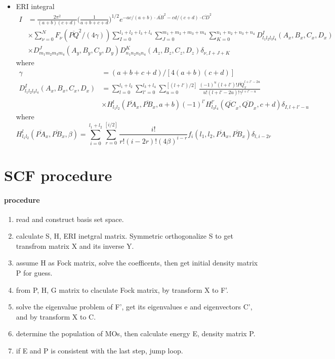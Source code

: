 \documentclass[11pt]{article}
\providecommand{\tightlist}{%
      \setlength{\itemsep}{0pt}\setlength{\parskip}{0pt}}
\begin{document}
    \begin{itemize}
\tightlist
\item
  ERI integral\\
  \begin{align*}
  I &= \frac{2\pi^2}{(a+b)(c+d)}\big(\frac{1}{a+b+c+d}\big)^{1/2} e^{-ac/(a+b)\cdot \overline{AB}^2 - cd/(c+d)\cdot \overline{CD}^2} 
  \\ 
  &\times
  \sum_{\nu=0}^{N} F_{\nu}(\overline{PQ}^2/(4\gamma))\sum_{I=0}^{l_1+l_2+l_3+l_4}
  \sum_{J=0}^{m_1+m_2+m_3+m_4}\sum_{K=0}^{n_1+n_2+n_3+n_4}
  D_{l_1l_2l_3l_4}^I (A_x,B_x,C_x,D_x)
  \\ 
  &\times
  D_{m_1m_2m_3m_4}^J (A_y,B_y,C_y,D_y)
  D_{n_1n_2n_3n_4}^K (A_z,B_z,C_z,D_z)\delta_{\nu,I+J+K}
   \end{align*}
   where
  \begin{align*}
  \gamma &= (a+b+c+d)/[4(a+b)(c+d)]
  \\
  D_{l_1l_2l_3l_4}^I (A_x,B_x,C_x,D_x) &= \sum_{l=0}^{l_1+l_2}\sum_{l'=0}^{l_3+l_4}
  \sum_{u=0}^{[(l+l')/2]} \frac{(-1)^u (l+l')! \overline{PQ}_x^{l+l'-2u}}{u!(l+l'-2u)!\gamma^{l+l'-u}}
  \\ 
  &\times
  H_{l_1l_2}^l (\overline{PA}_x,\overline{PB}_x,a+b) (-1)^{l'} 
  H_{l_3l_4}^{l'} (\overline{QC}_x,\overline{QD}_x,c+d)\delta_{I,l+l'-u}
  \end{align*}
  where 
  \[
  H_{l_1l_2}^l (\overline{PA}_x,\overline{PB}_x,\beta)
  = \sum_{i=0}^{l_1+l_2}\sum_{r=0}^{[i/2]} \frac{i!}{r!(i-2r)!(4\beta)^{i-r}} f_i (l_1,l_2,\overline{PA}_x,\overline{PB}_x)\delta_{l,i-2r}
  \]
\end{itemize}

    \section{SCF procedure}\label{scf-procedure}

    \paragraph{procedure}\label{procedure}

\begin{enumerate}
\def\labelenumi{\arabic{enumi}.}
\tightlist
\item
  read and construct basis set space.\\
\item
  calculate S, H, ERI inetgral matrix. Symmetric orthogonalize S to get
  transfrom matrix X and its inverse Y.
\item
  assume H as Fock matrix, solve the coefficents, then get initial
  density matrix P for guess.
\item
  from P, H, G matrix to claculate Fock matrix, by transform X to F'.
\item
  solve the eigenvalue problem of F', get its eigenvalues e and
  eigenvectors C', and by transform X to C.
\item
  determine the population of MOs, then calculate energy E, density
  matrix P.\\
\item
  if E and P is consistent with the last step, jump loop.
\end{enumerate}
\end{document}
